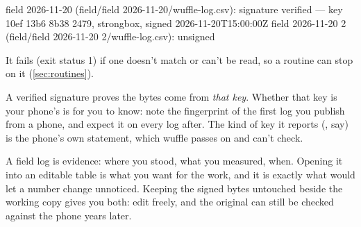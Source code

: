 \begin{codeblock}
field 2026-11-20  (field/field 2026-11-20/wuffle-log.csv): signature verified — key 10ef 13b6 8b38 2479, strongbox, signed 2026-11-20T15:00:00Z
field 2026-11-20 2  (field/field 2026-11-20 2/wuffle-log.csv): unsigned
\end{codeblock}

It fails (exit status 1) if one doesn't match or can't be read, so a routine can stop on it
(\cref{sec:routines}).

\begin{caution}
A verified signature proves the bytes come from \emph{that key}. Whether that key is your phone's is for
you to know: note the fingerprint of the first log you publish from a phone, and expect it on every log
after. The kind of key it reports (, say) is the phone's own statement, which wuffle
passes on and can't check.
\end{caution}

\begin{why}
A field log is evidence: where you stood, what you measured, when. Opening it into an editable table is
what you want for the work, and it is exactly what would let a number change unnoticed. Keeping the
signed bytes untouched beside the working copy gives you both: edit freely, and the original can still
be checked against the phone years later.
\end{why}
